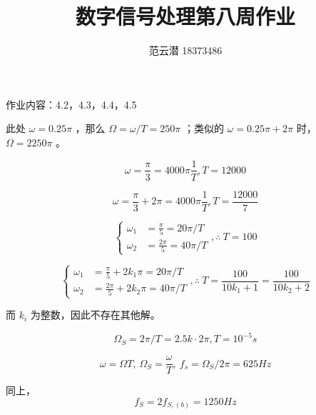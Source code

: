 \documentclass[lang=cn,11pt,a4paper,cite=authoryear,twocolumn]{elegantpaper}
\title{数字信号处理\quad 第八周作业}
\author{范云潜 18373486}
\institute{微电子学院 184111 班}
\date{\zhtoday}
\begin{document}
\maketitle

作业内容：4.2，4.3，4.4，4.5



此处 \(\omega = 0.25 \pi \) ，那么 \(\Omega = \omega / T = 250 \pi\) ；类似的 \(\omega = 0.25 \pi + 2 \pi \) 时， \(\Omega = 2250 \pi \) 。



\[\omega = \frac{\pi}{3} = 4000\pi \frac{1}{T} , T = 12000\]


\[\omega = \frac{\pi}{3} + 2 \pi = 4000\pi \frac{1}{T} , T = \frac{12000}{7}\]



\[\left\{\begin{aligned}
    \omega_1 &= \frac{\pi}{5} = 20 \pi / T \\
    \omega_2 &= \frac{2 \pi }{5} = 40 \pi / T
\end{aligned}\right., \therefore\: T = 100\]


\[\left\{\begin{aligned}
    \omega_1 &= \frac{\pi}{5} + 2k_1 \pi = 20 \pi / T \\
    \omega_2 &= \frac{2 \pi }{5} + 2 k_2 \pi = 40 \pi / T
\end{aligned}\right., \therefore\: T = \frac{100}{10k_1 + 1} = \frac{100}{10k_2 + 2}\]

而 \(k_i\) 为整数，因此不存在其他解。



\[\Omega_S = 2\pi / T = 2.5 k \cdot 2 \pi, T = 10^{-5} s\]


\[\omega = \Omega T,\: \Omega_S = \frac{\omega}{T}, \: f_s = \Omega_S/2\pi = 625Hz\]


同上，\[f_S = 2 f_{S,(b)} = 1250 Hz\]






\end{document}
